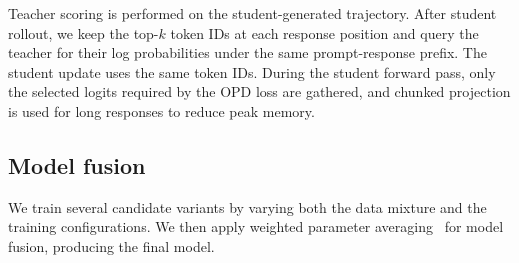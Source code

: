 Teacher scoring is performed on the student-generated trajectory. After student rollout, we keep the top-\(k\) token IDs at each response position and query the teacher for their log probabilities under the same prompt-response prefix. The student update uses the same token IDs. During the student forward pass, only the selected logits required by the OPD loss are gathered, and chunked projection is used for long responses to reduce peak memory.

\subsection{Model fusion}

We train several candidate \ours{} variants by varying both the data mixture and the training configurations. We then apply weighted parameter averaging~\cite{wortsman2022model} for model fusion, producing the final \ours{} model.
